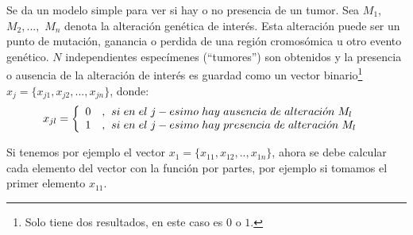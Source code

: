\begin{myexample}
Se da un modelo simple\cite{Cancer} para ver si hay o no presencia de un tumor. Sea $M_{1}$, $M_{2},...,$ $M_{n}$ denota la alteración genética de interés. Esta alteración puede ser un punto de mutación, ganancia o perdida de una región cromosómica u otro evento genético. $N$ independientes especímenes (``tumores'') son obtenidos y la presencia o ausencia de la alteración de interés es guardad como un vector binario\footnote{Solo tiene dos resultados, en este caso es $0$ o $1$.} $x_{j}=\{x_{j1},x_{j2},...,x_{jn}\}$, donde: \\

	\begin{eqnarray*}
 x_{jl}= \left\{\begin{array}{ll}
0&,\hspace{4px} si\hspace{3px}en\hspace{3px}el\hspace{3px}j-esimo\hspace{3px}hay \hspace{3px}ausencia\hspace{3px}de\hspace{3px}alteraci\acute{o}n\hspace{3px}M_{l}\\
1 &,\hspace{4px} si\hspace{3px}en\hspace{3px}el\hspace{3px}j-esimo\hspace{3px}hay \hspace{3px}presencia\hspace{3px}de\hspace{3px}alteraci\acute{o}n\hspace{3px}M_{l}\\ 
				\end{array} \hspace{6px} \right.
	\end{eqnarray*}
	
Si tenemos por ejemplo el vector $x_{1}=\{x_{11},x_{12},..,x_{1n}\}$, ahora se debe calcular cada elemento del vector con la función por partes, por ejemplo si tomamos el primer elemento $x_{11}$.\\


\end{myexample}
